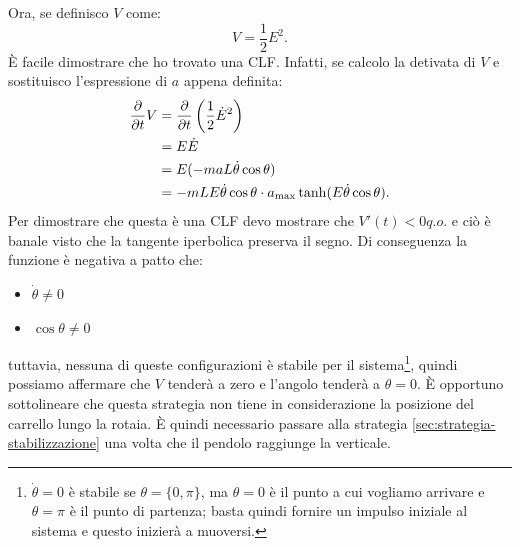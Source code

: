 Ora, se definisco $V$ come:
\begin{equation}
    V = \frac 1 2 E^2.
    \label{eq:lyapunov-energy}
\end{equation}
È facile dimostrare che ho trovato una CLF. Infatti, se calcolo la detivata di $V$ e sostituisco l'espressione di $a$ appena definita:
\begin{equation}
    \begin{aligned}
        \frac \partial {\partial t} V &= \frac \partial {\partial t} \left( \frac 1 2 \dot E^2\right) \\
        &=  E \dot E \\
        &=  E (-maL \dot \theta \cos \theta) \\
        &= -mLE\dot \theta \cos \theta \cdot a_{\max} \tanh(E \dot \theta \cos \theta).
    \end{aligned}
    \label{eq:lyapunov-energy}
\end{equation}
Per dimostrare che questa è una CLF devo mostrare che $V'(t) < 0 q.o.$ e ciò è banale visto che la tangente iperbolica preserva il segno. Di conseguenza la funzione è negativa a patto che:
\begin{itemize}
    \item $\dot \theta \neq 0$
    \item $\cos \theta \neq 0$
\end{itemize}
tuttavia, nessuna di queste configurazioni è stabile per il sistema\footnote{$\dot \theta = 0$ è stabile se $\theta = \{0, \pi\}$, ma $\theta = 0$ è il punto a cui vogliamo arrivare e $\theta = \pi$ è il punto di partenza; basta quindi fornire un impulso iniziale al sistema e questo inizierà a muoversi.}, quindi possiamo affermare che $V$ tenderà a zero e l'angolo tenderà a $\theta = 0$.
È opportuno sottolineare che questa strategia non tiene in considerazione la posizione del carrello lungo la rotaia.
È quindi necessario passare alla strategia \ref{sec:strategia-stabilizzazione}
una volta che il pendolo raggiunge la verticale.